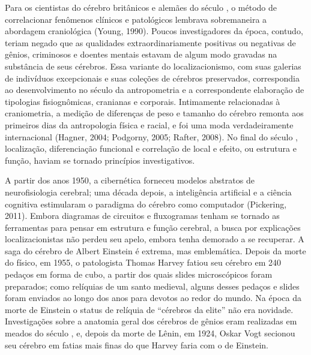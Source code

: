 Para os cientistas do cérebro britânicos e alemães do século , o
método de correlacionar fenômenos clínicos e patológicos lembrava
sobremaneira a abordagem craniológica (Young, 1990). Poucos
investigadores da época, contudo, teriam negado que as qualidades
extraordinariamente positivas ou negativas de gênios, criminosos e
doentes mentais estavam de algum modo gravadas na substância de
seus cérebros. Essa variante do localizacionismo, com suas galerias de
indivíduos excepcionais e suas coleções de cérebros preservados,
correspondia ao desenvolvimento no século  da antropometria e a
correspondente elaboração de tipologias fisiognômicas, cranianas e
corporais. Intimamente relacionadas à craniometria, a medição de
diferenças de peso e tamanho do cérebro remonta aos primeiros dias da
antropologia física e racial, e foi uma moda verdadeiramente
internacional (Hagner, 2004; Podgorny, 2005; Rafter, 2008). No final do
século , localização, diferenciação funcional e correlação de local e
efeito, ou estrutura e função, haviam se tornado princípios
investigativos.

A partir dos anos 1950, a cibernética forneceu modelos abstratos de
neurofisiologia cerebral; uma década depois, a inteligência artificial e
a ciência cognitiva estimularam o paradigma do cérebro como computador
(Pickering, 2011). Embora diagramas de circuitos e fluxogramas tenham se
tornado as ferramentas para pensar em estrutura e função cerebral, a
busca por explicações localizacionistas não perdeu seu apelo, embora
tenha demorado a se recuperar. A saga do cérebro de Albert Einstein é
extrema, mas emblemática. Depois da morte do físico, em 1955, o
patologista Thomas Harvey fatiou seu cérebro em 240 pedaços em forma de
cubo, a partir dos quais slides microscópicos foram preparados; como
relíquias de um santo medieval, alguns desses pedaços e slides foram
enviados ao longo dos anos para devotos ao redor do mundo. Na época da
morte de Einstein o status de relíquia de ``cérebros da elite'' não era
novidade. Investigações sobre a anatomia geral dos cérebros de gênios
eram realizadas em meados do século , e, depois da morte de Lênin, em
1924, Oskar Vogt secionou seu cérebro em fatias mais finas do que Harvey
faria com o de Einstein.

